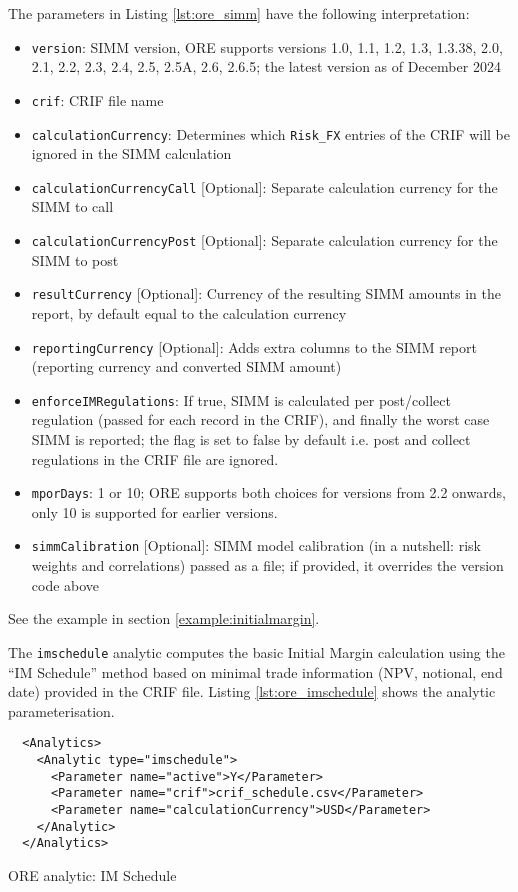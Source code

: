 {The parameters in Listing \ref{lst:ore_simm} have the following interpretation:

\begin{itemize}
\item {\tt version}: SIMM version, ORE supports versions 1.0, 1.1, 1.2, 1.3, 1.3.38, 2.0, 2.1, 2.2, 2.3, 2.4, 2.5, 2.5A, 2.6, 2.6.5; the latest version as of December 2024
\item {\tt crif}: CRIF file name
\item {\tt calculationCurrency}: Determines which {\tt Risk\_FX} entries of the CRIF will be ignored
  in the SIMM calculation
\item {\tt calculationCurrencyCall} [Optional]: Separate calculation currency for the SIMM to call
\item {\tt calculationCurrencyPost} [Optional]: Separate calculation currency for the SIMM to post
\item {\tt resultCurrency} [Optional]: Currency of the resulting SIMM amounts in the report, by default equal to the calculation currency
\item {\tt reportingCurrency} [Optional]: Adds extra columns to the SIMM report (reporting currency and converted SIMM amount)
\item {\tt enforceIMRegulations}: If true, SIMM is calculated per post/collect regulation (passed for each record in the CRIF), and finally the worst case SIMM is reported; the flag is set to false by default i.e. post and collect regulations in the CRIF file are ignored. 
\item {\tt mporDays}: 1 or 10; ORE supports both choices for versions from 2.2 onwards, only 10 is supported for earlier versions. 
\item {\tt simmCalibration} [Optional]: SIMM model calibration (in a nutshell: risk weights and correlations) passed as a file; if provided, it overrides the version code above
\end{itemize}

See the example in section \ref{example:initialmargin}.

\medskip
The {\tt imschedule} analytic computes the basic Initial Margin calculation using the ``IM Schedule''
method based on minimal trade information (NPV, notional, end date) provided in the CRIF file.
Listing \ref{lst:ore_imschedule} shows the analytic parameterisation.

\begin{listing}[H]
\begin{verbatim}
  <Analytics>
    <Analytic type="imschedule">
      <Parameter name="active">Y</Parameter>
      <Parameter name="crif">crif_schedule.csv</Parameter>
      <Parameter name="calculationCurrency">USD</Parameter>
    </Analytic>
  </Analytics>
\end{verbatim}
\caption{ORE analytic: IM Schedule}
\label{lst:ore_imschedule}
\end{listing}

}
